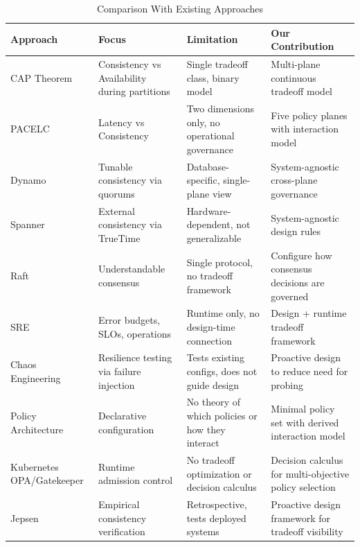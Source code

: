 \documentclass[conference]{IEEEtran}
\begin{document}
\begin{table}[t]
\caption{Comparison With Existing Approaches}
\label{tab:novelty}
\centering
\small
\renewcommand{\arraystretch}{1.15}

\begin{tabularx}{\columnwidth}{@{}p{1.8cm}X X X@{}}
\toprule
\textbf{Approach} &
\textbf{Focus} &
\textbf{Limitation} &
\textbf{Our Contribution} \\
\midrule

CAP Theorem~\cite{brewer2000cap}
& Consistency vs Availability during partitions
& Single tradeoff class, binary model
& Multi-plane continuous tradeoff model \\

PACELC~\cite{pacelc}
& Latency vs Consistency
& Two dimensions only, no operational governance
& Five policy planes with interaction model \\

Dynamo~\cite{dynamo}
& Tunable consistency via quorums
& Database-specific, single-plane view
& System-agnostic cross-plane governance \\

Spanner~\cite{spanner}
& External consistency via TrueTime
& Hardware-dependent, not generalizable
& System-agnostic design rules \\

Raft~\cite{raft}
& Understandable consensus
& Single protocol, no tradeoff framework
& Configure how consensus decisions are governed \\

SRE~\cite{sre}
& Error budgets, SLOs, operations
& Runtime only, no design-time connection
& Design + runtime tradeoff framework \\

Chaos Engineering~\cite{chaos}
& Resilience testing via failure injection
& Tests existing configs, does not guide design
& Proactive design to reduce need for probing \\

Policy Architecture~\cite{policyarch}
& Declarative configuration
& No theory of which policies or how they interact
& Minimal policy set with derived interaction model \\

Kubernetes OPA/Gatekeeper
& Runtime admission control
& No tradeoff optimization or decision calculus
& Decision calculus for multi-objective policy selection \\

Jepsen~\cite{jepsen}
& Empirical consistency verification
& Retrospective, tests deployed systems
& Proactive design framework for tradeoff visibility \\

\bottomrule
\end{tabularx}
\end{table}
\end{document}
